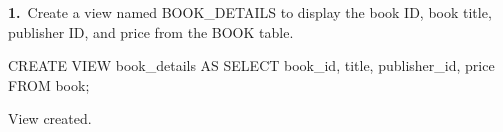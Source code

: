 \noindent\begin{minipage}{\linewidth}
\begingroup{}
{\fontsize{14}{17}\selectfont\textbf{1.}}\ Create a view named BOOK\_DETAILS to display the book ID, book title, publisher ID, and price from the BOOK table.\par
\endgroup\vspace{12pt}


\begin{sqlcode}
CREATE VIEW book_details AS
SELECT book_id, title, publisher_id, price
FROM book;
\end{sqlcode}

\vspace{18pt}


\begin{sqlout}[fontsize=\small]
View created.
\end{sqlout}
\end{minipage}\par\vspace{24pt}

